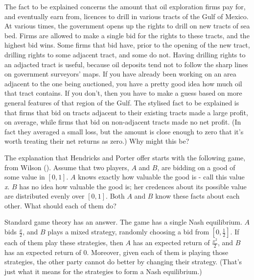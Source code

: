 \documentclass[
  11pt,
  letterpaper,
  DIV=11,
  numbers=noendperiod,
  twoside]{scrartcl}
\begin{document}
The fact to be explained concerns the amount that oil exploration firms
pay for, and eventually earn from, licences to drill in various tracts
of the Gulf of Mexico. At various times, the government opens up the
rights to drill on new tracts of sea bed. Firms are allowed to make a
single bid for the rights to these tracts, and the highest bid wins.
Some firms that bid have, prior to the opening of the new tract,
drilling rights to some adjacent tract, and some do not. Having drilling
rights to an adjacted tract is useful, because oil deposits tend not to
follow the sharp lines on government surveyors' maps. If you have
already been working on an area adjacent to the one being auctioned, you
have a pretty good idea how much oil that tract contains. If you don't,
then you have to make a guess based on more general features of that
region of the Gulf. The stylised fact to be explained is that firms that
bid on tracts adjacent to their existing tracts made a large profit, on
average, while firms that bid on non-adjacent tracts made no net profit.
(In fact they averaged a small loss, but the amount is close enough to
zero that it's worth treating their net returns as zero.) Why might this
be?

The explanation that Hendricks and Porter offer starts with the
following game, from Wilson (). Assume
that two players, \(A\) and \(B\), are bidding on a good of some value
in \([0, 1]\). \(A\) knows exactly how valuable the good is - call this
value \emph{x}. \(B\) has no idea how valuable the good is; her
credences about its possible value are distributed evenly over
\([0, 1]\). Both \(A\) and \(B\) know these facts about each other. What
should each of them do?

Standard game theory has an answer. The game has a single Nash
equilibrium. \(A\) bids \(\frac{x}{2}\), and \(B\) plays a mixed
strategy, randomly choosing a bid from \([0, \frac{1}{2}]\). If each of
them play these strategies, then \(A\) has an expected return of
\(\frac{x^2}{2}\), and \(B\) has an expected return of 0. Moreover,
given each of them is playing those strategies, the other party cannot
do better by changing their strategy. (That's just what it means for the
strategies to form a Nash equilibrium.)
\end{document}
